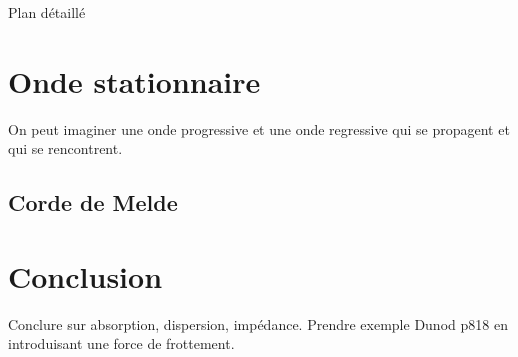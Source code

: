 \begin{reportBlock}{Plan détaillé}
  \section{Onde stationnaire}
  On peut imaginer une onde progressive et une onde regressive qui se propagent et qui se rencontrent. 
  

  \subsection{Corde de Melde}

  \section{Conclusion}
  Conclure sur absorption, dispersion, impédance. Prendre exemple Dunod p818 en introduisant une force de frottement.


\end{reportBlock}